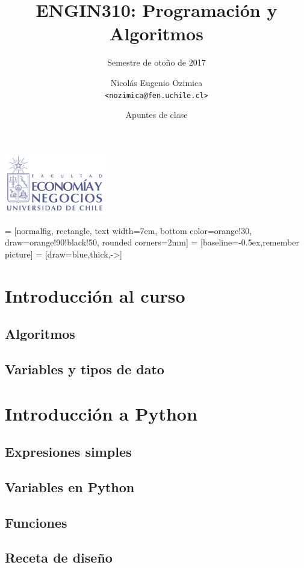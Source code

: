 \documentclass[12pt,xcolor={dvipsnames,x11names},t]{beamer}
\title{ENGIN310: Programación y Algoritmos}
\subtitle{Semestre de otoño de 2017}
\author{Nicolás Eugenio Ozimica\\[.4em]\texttt{<nozimica@fen.uchile.cl>}}
\date{Apuntes de clase}
\begin{document}
\begin{frame}[plain]
    \centering \includegraphics[height=26mm]{img/logoFen.png}\\
    \centering
    \titlepage
\end{frame}

\def\opacityblock{.3}

 = [normalfig, rectangle, text width=7em, bottom color=orange!30, draw=orange!90!black!50, rounded corners=2mm]
 = [baseline=-0.5ex,remember picture]
 = [draw=blue,thick,->]

\def\tightlist{}

\section{Introducción al curso}
\subsection{Algoritmos}

\subsection{Variables y tipos de dato}

\section{Introducción a Python}
\subsection{Expresiones simples}

\subsection{Variables en Python}

\subsection{Funciones}


\subsection{Receta de diseño}

\end{document}
